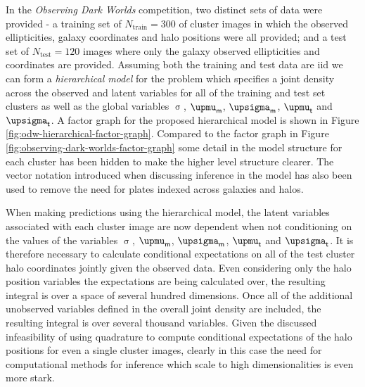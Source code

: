 In the \emph{Observing Dark Worlds} competition, two distinct sets of data were provided - a training set of $N_{\textrm{train}} = 300$ of cluster images in which the observed ellipticities, galaxy coordinates and halo positions were all provided; and a test set of $N_{\textrm{test}} = 120$ images where only the galaxy observed ellipticities and coordinates are provided. Assuming both the training and test data are \ac{iid} we can form a \emph{hierarchical model} for the problem which specifies a joint density across the observed and latent variables for all of the training and test set clusters as well as the global variables $\upsigma$, $\upmu_{\rvar{m}}$, $\upsigma_{\rvar{m}}$, $\upmu_{\rvar{t}}$ and $\upsigma_{\rvar{t}}$. A factor graph for the proposed hierarchical model is shown in Figure \ref{fig:odw-hierarchical-factor-graph}. Compared to the factor graph in Figure \ref{fig:observing-dark-worlds-factor-graph} some detail in the model structure for each cluster has been hidden to make the higher level structure clearer. The vector notation introduced when discussing inference in the model has also been used to remove the need for plates indexed across galaxies and halos. %


When making predictions using the hierarchical model, the latent variables associated with each cluster image are now dependent when not conditioning on the values of the variables $\upsigma$, $\upmu_{\rvar{m}}$, $\upsigma_{\rvar{m}}$, $\upmu_{\rvar{t}}$ and $\upsigma_{\rvar{t}}$. It is therefore necessary to calculate conditional expectations on all of the test cluster halo coordinates jointly given the observed data. Even considering only the halo position variables the expectations are being calculated over, the resulting integral is over a space of several hundred dimensions. Once all of the additional unobserved variables defined in the overall joint density are included, the resulting integral is over several thousand variables. Given the discussed infeasibility of using quadrature to compute conditional expectations of the halo positions for even a single cluster images, clearly in this case the need for computational methods for inference which scale to high dimensionalities is even more stark.



